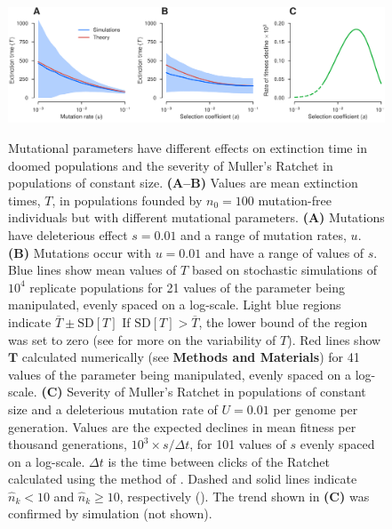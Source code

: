 \documentclass[9pt,lineno]{elife}
\begin{document}
\begin{figure}[ht!]
\includegraphics[width=\linewidth]{valid.pdf}
\caption{
Mutational parameters have different effects on extinction time in doomed populations and the severity of Muller's Ratchet in populations of constant size.
%
\textbf{(A--B)} Values are mean extinction times, $T$, in populations founded by $n_0=100$ mutation-free individuals but with different mutational parameters.
%
\textbf{(A)} Mutations have deleterious effect $s=0.01$ and a range of mutation rates, $u$.
%
\textbf{(B)} Mutations occur with $u=0.01$ and have a range of values of $s$.
%
Blue lines show mean values of $T$ based on stochastic simulations of $10^4$ replicate populations for 21 values of the parameter being manipulated, evenly spaced on a log-scale.
%
Light blue regions indicate $\overline{T} \pm  \mathrm{SD}[T]$  If $\mathrm{SD}[T] > \overline{T}$, the lower bound of the region was set to zero (see  for more on the variability of $T$).
%
Red lines show $\mathbf{T}$ calculated numerically (see \textbf{Methods and Materials}) for 41 values of the parameter being manipulated, evenly spaced on a log-scale.
%
\textbf{(C)} Severity of Muller's Ratchet in populations of constant size and a deleterious mutation rate of $U = 0.01$ per genome per generation.  Values are the expected declines in mean fitness per thousand generations, $10^3 \times s/\Delta t$, for 101 values of $s$ evenly spaced on a log-scale.  
$\Delta t$ is the time between clicks of the Ratchet calculated using the method of \citet{Gordo_On_2000, gor00b}.
Dashed and solid lines indicate $\hat n_k < 10$ and $\hat n_k \geq 10$, respectively ().  
%
The trend shown in \textbf{(C)} was confirmed by simulation (not shown).
}
\label{fig:valid}
\label{figsupp:sf2}
\end{figure}
\end{document}
